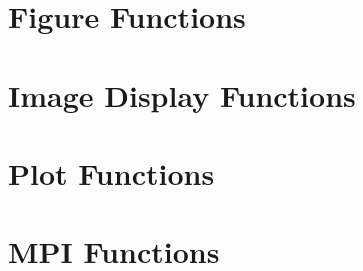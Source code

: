 \documentclass{book}
\begin{document}
\section{Figure Functions}





\section{Image Display Functions}





\section{Plot Functions}








\section{MPI Functions}














\end{document}

